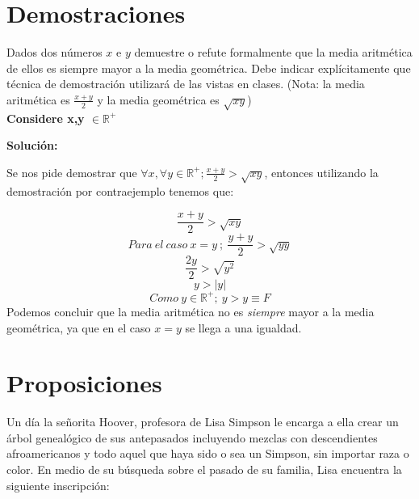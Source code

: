 \documentclass[letterpaper,10pt]{article}
\begin{document}
\section{Demostraciones}
Dados dos números $x$ e $y$ demuestre o refute formalmente que la media aritmética de ellos es siempre mayor a la media geométrica. Debe indicar explícitamente que técnica de demostración utilizará de las vistas en clases. (Nota: la media aritmética es $\frac{x+y}{2}$ y la media geométrica es $\sqrt{xy}$)\\ \textbf{Considere x,y $\in \mathbb R^+$}

\textbf{Solución:}
\newline
\newline
\begin{minipage}[c]{\textwidth}
    Se nos pide demostrar que $\forall x, \forall y \in \mathbb R^+ ; \frac{x+y}{2} > \sqrt{xy}$, entonces utilizando la demostración por contraejemplo tenemos que:

    \begin{equation*}
        \frac{x+y}{2} > \sqrt{xy}
    \end{equation*}
    \begin{equation*}
        Para \ el \ caso \  x=y \ ; \  \frac{y+y}{2} > \sqrt{yy}
    \end{equation*}
    \begin{equation*}
        \frac{2y}{2} > \sqrt{y^2}
    \end{equation*}
    \begin{equation*}
        y > \left|y\right|
    \end{equation*}
    \begin{equation*}
        Como \ y \in \mathbb R^+ ;\  y > y \equiv F
    \end{equation*}
    Podemos concluir que la media aritmética no es \textit{siempre} mayor a la media geométrica, ya que en el caso $x = y$ se llega a una igualdad.
\end{minipage}




\newpage
\section{Proposiciones}

Un día la señorita Hoover, profesora de Lisa Simpson le encarga a ella crear un árbol genealógico de sus antepasados incluyendo mezclas con descendientes afroamericanos y todo aquel que haya sido o sea un Simpson, sin importar raza o color. En medio de su búsqueda sobre el pasado de su familia, Lisa encuentra la siguiente inscripción:
\end{document}

